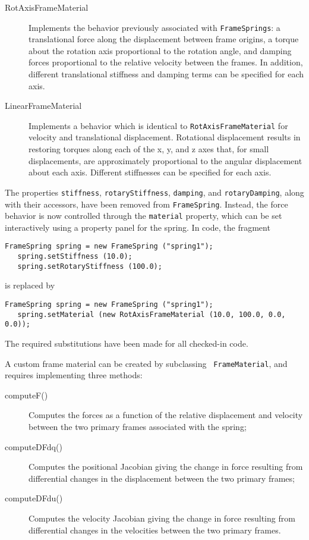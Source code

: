 \documentclass{article}
\begin{document}
\begin{description}

\item[RotAxisFrameMaterial] \mbox{} Implements the behavior previously
associated with {\tt FrameSprings}: a translational force along the
displacement between frame origins, a torque about the rotation axis
proportional to the rotation angle, and damping forces proportional to
the relative velocity between the frames.
In addition, different translational stiffness and damping terms can
be specified for each axis.

\item[LinearFrameMaterial] \mbox{} Implements a behavior which is
identical to {\tt RotAxisFrameMaterial} for velocity and translational
displacement. Rotational displacement results in restoring torques
along each of the x, y, and z axes that, for small displacements, are
approximately proportional to the angular displacement about each
axis.  Different stiffnesses can be specified for each axis.

\end{description}

The properties {\tt stiffness}, {\tt rotaryStiffness}, {\tt damping},
and {\tt rotaryDamping}, along with their accessors, have been removed
from {\tt FrameSpring}. Instead, the force behavior is now controlled
through the {\tt material} property, which can be set interactively
using a property panel for the spring. In code, the fragment
\begin{lstlisting}[]
   FrameSpring spring = new FrameSpring ("spring1");
   spring.setStiffness (10.0);
   spring.setRotaryStiffness (100.0);
\end{lstlisting}
is replaced by
\begin{lstlisting}[]
   FrameSpring spring = new FrameSpring ("spring1");
   spring.setMaterial (new RotAxisFrameMaterial (10.0, 100.0, 0.0, 0.0));
\end{lstlisting}

The required substitutions have been made for all checked-in code.

A custom frame material can be created by subclassing {\tt
FrameMaterial}, and requires implementing three methods:

\begin{description}

\item[computeF()] \mbox{}
Computes the forces as a function of the relative displacement and
velocity between the two primary frames associated with the spring;

\item[computeDFdq()] \mbox{}
Computes the positional Jacobian giving the change in force
resulting from differential changes in the displacement
between the two primary frames;

\item[computeDFdu()] \mbox{} Computes the velocity Jacobian giving the
change in force resulting from differential changes in the
velocities between the two primary frames.

\end{description}
\end{document}
